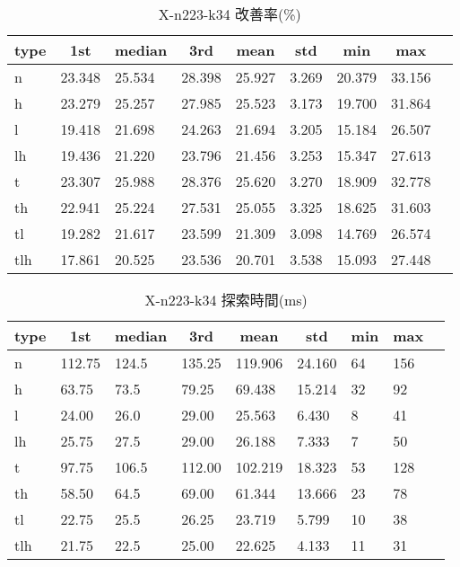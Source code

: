 \begin{table}[htbp]
    \centering
    \caption{X-n223-k34 改善率(\%)}
    \begin{tabular}{|l|l|l|l|l|l|l|l|l|}\hline
    \multicolumn{1}{|c|}{\textbf{type}}
    &\multicolumn{1}{|c|}{\textbf{1st}}
    &\multicolumn{1}{c|}{\textbf{median}}
    &\multicolumn{1}{c|}{\textbf{3rd}}
    &\multicolumn{1}{c|}{\textbf{mean}}
    &\multicolumn{1}{c|}{\textbf{std}}
    &\multicolumn{1}{c|}{\textbf{min}}
    &\multicolumn{1}{c|}{\textbf{max}}\\\hline
	n & 23.348 & 25.534 & 28.398 & 25.927 & 3.269 & 20.379 & 33.156\\\hline
	h & 23.279 & 25.257 & 27.985 & 25.523 & 3.173 & 19.700 & 31.864\\\hline
	l & 19.418 & 21.698 & 24.263 & 21.694 & 3.205 & 15.184 & 26.507\\\hline
	lh & 19.436 & 21.220 & 23.796 & 21.456 & 3.253 & 15.347 & 27.613\\\hline
	t & 23.307 & 25.988 & 28.376 & 25.620 & 3.270 & 18.909 & 32.778\\\hline
	th & 22.941 & 25.224 & 27.531 & 25.055 & 3.325 & 18.625 & 31.603\\\hline
	tl & 19.282 & 21.617 & 23.599 & 21.309 & 3.098 & 14.769 & 26.574\\\hline
	tlh & 17.861 & 20.525 & 23.536 & 20.701 & 3.538 & 15.093 & 27.448\\\hline
	\end{tabular}
\end{table}
\begin{table}[htbp]
    \centering
    \caption{X-n223-k34 探索時間(ms)}
    \begin{tabular}{|l|l|l|l|l|l|l|l|l|}\hline
    \multicolumn{1}{|c|}{\textbf{type}}
    &\multicolumn{1}{|c|}{\textbf{1st}}
    &\multicolumn{1}{c|}{\textbf{median}}
    &\multicolumn{1}{c|}{\textbf{3rd}}
    &\multicolumn{1}{c|}{\textbf{mean}}
    &\multicolumn{1}{c|}{\textbf{std}}
    &\multicolumn{1}{c|}{\textbf{min}}
    &\multicolumn{1}{c|}{\textbf{max}}\\\hline
	n & 112.75 & 124.5 & 135.25 & 119.906 & 24.160 & 64 & 156\\\hline
	h & 63.75 & 73.5 & 79.25 & 69.438 & 15.214 & 32 & 92\\\hline
	l & 24.00 & 26.0 & 29.00 & 25.563 & 6.430 & 8 & 41\\\hline
	lh & 25.75 & 27.5 & 29.00 & 26.188 & 7.333 & 7 & 50\\\hline
	t & 97.75 & 106.5 & 112.00 & 102.219 & 18.323 & 53 & 128\\\hline
	th & 58.50 & 64.5 & 69.00 & 61.344 & 13.666 & 23 & 78\\\hline
	tl & 22.75 & 25.5 & 26.25 & 23.719 & 5.799 & 10 & 38\\\hline
	tlh & 21.75 & 22.5 & 25.00 & 22.625 & 4.133 & 11 & 31\\\hline
	\end{tabular}
\end{table}
